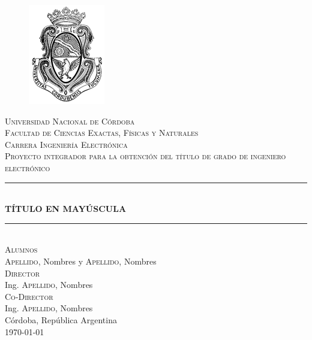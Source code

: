 \documentclass[12pt,A4paper,titlepage, twoside, openright]{report}
\renewcommand{\tablename}{Tabla}
\begin{document}
\renewcommand{\listfigurename}{Lista de Figuras}
\renewcommand{\listtablename}{Lista de Tablas}
\renewcommand{\contentsname}{Índice}

\renewcommand{\tablename}{Tabla}


\newcommand{\HRule}{\rule{\linewidth}{0.5mm}} %

\begin{titlepage}
\begin{center}
	
\begin{figure}[h]
	\begin{center}
		\includegraphics{logo_unc.png}
	\end{center}
\end{figure}
\vspace{0.5em}

\textsc{\LARGE Universidad Nacional de Córdoba}\\[0.3cm] %
\textsc{\Large Facultad de Ciencias Exactas, Físicas y Naturales}\\[0.3cm] %
\textsc{\Large Carrera Ingeniería Electrónica}\\[0.75cm] %

\textsc{\large Proyecto integrador para la obtención del título de grado de ingeniero electrónico}\\[1.0cm]

\HRule \\[0.4cm]
\textsc{\textbf{TÍTULO EN MAYÚSCULA}}\\[0.4cm] %
\HRule \\[1.5cm]

\textsc{\Large Alumnos}\\[0.1cm]
\large \textsc{Apellido}, Nombres y \textsc{Apellido}, Nombres \\[0.5cm]

\textsc{\large Director}\\[0.1cm]
Ing. \textsc{Apellido}, Nombres \\[0.5cm]

\textsc{\large Co-Director}\\[0.1cm]
Ing. \textsc{Apellido}, Nombres \\[2.5cm]

Córdoba, República Argentina \\
\monthyeardate\today %


\end{center}
\end{titlepage}
\end{document}
